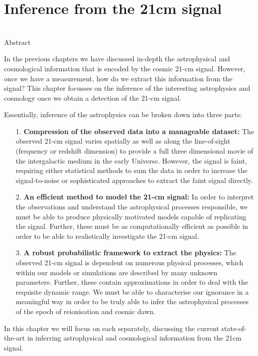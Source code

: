 \chapter{Inference from the 21cm signal}

\begin{bf}
  \author{Bradley Greig}\\
  
Abstract\\
\end{bf}

In the previous chapters we have discussed in-depth the astrophysical and cosmological information that is encoded by the cosmic 21-cm signal. However, once we have a measurement, how do we extract this information from the signal? This chapter focusses on the inference of the interesting astrophysics and cosmology once we obtain a detection of the 21-cm signal. 

Essentially, inference of the astrophysics can be broken down into three parts:
\begin{itemize}
\item[1.] \textbf{Compression of the observed data into a manageable dataset:} The observed 21-cm signal varies spatially as well as along the line-of-sight (frequency or redshift dimension) to provide a full three dimensional movie of the intergalactic medium in the early Universe. However, the signal is faint, requiring either statistical methods to sum the data in order to increase the signal-to-noise or sophisticated approaches to extract the faint signal directly. 
\item[2.] \textbf{An efficient method to model the 21-cm signal:} In order to interpret the observations and understand the astrophysical processes responsible, we must be able to produce physically motivated models capable of replicating the signal. Further, these must be as computationally efficient as possible in order to be able to realistically investigate the 21-cm signal.
\item[3.] \textbf{A robust probabilistic framework to extract the physics:} The observed 21-cm signal is dependent on numerous physical processes, which within our models or simulations are described by many unknown parameters. Further, these contain approximations in order to deal with the requisite dynamic range. We must be able to characterise our ignorance in a meaningful way in order to be truly able to infer the astrophysical processes of the epoch of reionisation and cosmic dawn.
\end{itemize}
\noindent
In this chapter we will focus on each separately, discussing the current state-of-the-art in inferring astrophysical and cosmological information from the 21cm signal.

